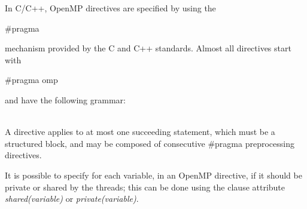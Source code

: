 \documentclass[a4paper,12pt,oneside]{book}
\begin{document}
In C/C++, OpenMP directives are specified by using the\begin{bf} $\#$pragma\end{bf} mechanism provided by the C and C++ standards.  Almost all directives start with \begin{bf}$\#$pragma omp\end{bf} and have the following grammar:
\begin{bf}{}\end{bf}
\\

A directive applies to at most one succeeding statement, which must be a structured block, and may be composed of consecutive $\#$pragma preprocessing directives. 

It is possible to specify for each variable, in an OpenMP directive, if it should be private or shared by the threads; this can be done using the clause attribute \emph{shared(variable)} or \emph{private(variable)}.
\end{document}
